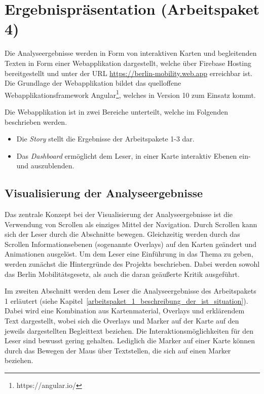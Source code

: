 \newpage

\section{Ergebnispräsentation (Arbeitspaket 4)}
\label{ergebnispraesentation}

Die Analyseergebnisse werden in Form von interaktiven Karten und begleitenden Texten in Form einer Webapplikation dargestellt, welche über Firebase Hosting bereitgestellt und unter der URL \url{https://berlin-mobility.web.app} erreichbar ist. Die Grundlage der Webapplikation bildet das quelloffene Webapplikationsframework Angular\footnote{https://angular.io/}, welches in Version 10 zum Einsatz kommt.


Die Webapplikation ist in zwei Bereiche unterteilt, welche im Folgenden beschrieben werden.

\begin{itemize}
    \item Die \emph{Story} stellt die Ergebnisse der Arbeitspakete 1-3 dar.
    \item Das \emph{Dashboard} ermöglicht dem Leser, in einer Karte interaktiv Ebenen ein- und auszublenden.
\end{itemize}

\subsection{Visualisierung der Analyseergebnisse}
\label{visualisierung_der_analyseergebnisse}

Das zentrale Konzept bei der Visualisierung der Analyseergebnisse ist die Verwendung von Scrollen als einziges Mittel der Navigation. Durch Scrollen kann sich der Leser durch die Abschnitte bewegen. Gleichzeitig werden durch das Scrollen Informationsebenen (sogenannte Overlays) auf den Karten geändert und Animationen ausgelöst.  Um dem Leser eine Einführung in das Thema zu geben, werden zunächst die Hintergründe des Projekts beschrieben. Dabei werden sowohl das Berlin Mobilitätsgesetz, als auch die daran geäußerte Kritik ausgeführt.

Im zweiten Abschnitt werden dem Leser die Analyseergebnisse des Arbeitspakets 1 erläutert (siehe Kapitel~\ref{arbeitspaket_1_beschreibung_der_ist_situation}). Dabei wird eine Kombination aus Kartenmaterial, Overlays und erklärendem Text dargestellt, wobei sich die Overlays und Marker auf der Karte auf den jeweils dargestellten Begleittext beziehen. Die Interaktionsmöglichkeiten für den Leser sind bewusst gering gehalten. Lediglich die Marker auf einer Karte können durch das Bewegen der Maus über Textstellen, die sich auf einen Marker beziehen.

